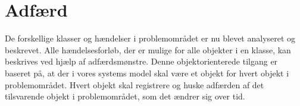 \section{Adfærd}
\label{sec:adfaerd}

De forskellige klasser og hændelser i problemområdet er nu blevet analyseret og beskrevet. Alle hændelsesforløb, der er mulige for alle objekter i en klasse, kan beskrives ved hjælp af adfærdsmønstre\cite[s.~90]{ooad}. Denne objektorienterede tilgang er baseret på, at der i vores systems model skal være et objekt for hvert objekt i problemområdet\cite[s.~91]{ooad}. Hvert objekt skal registrere og huske adfærden af det tilsvarende objekt i problemområdet, som det ændrer sig over tid.







